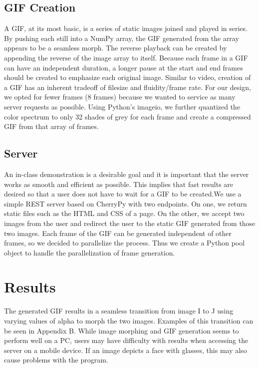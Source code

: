 \documentclass[journal]{IEEEtran}
\begin{document}
\subsection{GIF Creation}
A GIF, at its most basic, is a series of static images joined and played in series. By pushing each still into a NumPy array, the GIF generated from the array appears to be a seamless morph. The reverse playback can be created by appending the reverse of the image array to itself. Because each frame in a GIF can have an independent duration, a longer pause at the start and end frames should be created to emphasize each original image. Similar to video, creation of a GIF has an inherent tradeoff of filesize and fluidity/frame rate. For our design, we opted for fewer frames (8 frames) because we wanted to service as many server requests as possible. Using Python's imageio, we further quantized the color spectrum to only 32 shades of grey for each frame and create a compressed GIF from that array of frames.

\subsection{Server}
	An in-class demonstration is a desirable goal and it is important that the server works as smooth and efficient as possible. This implies that fast results are desired so that a user does not have to wait for a GIF to be created.We use a simple REST server based on CherryPy with two endpoints. On one, we return static files such as the HTML and CSS of a page. On the other, we accept two images from the user and redirect the user to the static GIF generated from those two images. Each frame of the GIF can be generated independent of other frames, so we decided to parallelize the process. Thus we create a Python pool object to handle the parallelization of frame generation. 



\section{Results}
	The generated GIF results in a seamless transition from image I to J using varying values of alpha to morph the two images. Examples of this transition can be seen in Appendix B. While image morphing and GIF generation seems to perform well on a PC, users may have difficulty with results when accessing the server on a mobile device. If an image depicts a face with glasses, this may also cause problems with the program.  
\end{document}
